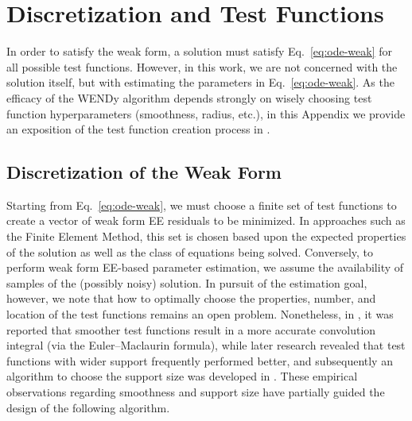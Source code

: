 \section{Discretization and Test Functions}\label{sec:appendix}
In order to satisfy the weak form, a solution must satisfy Eq.~\eqref{eq:ode-weak} for all possible test functions. However, in this work, we are not concerned with the solution itself, but with estimating the parameters in Eq.~\eqref{eq:ode-weak}. As the efficacy of the WENDy algorithm depends strongly on wisely choosing test function hyperparameters (smoothness, radius, etc.), in this Appendix we provide an exposition of the test function creation process in \cite{BortzMessengerDukic2023BullMathBiol}.
\subsection{Discretization of the Weak Form} \label{appendix:discWeak}

Starting from Eq.~\eqref{eq:ode-weak}, we must choose a finite set of test functions to create a vector of weak form EE residuals to be minimized. In approaches such as the Finite Element Method, this set is chosen based upon the expected properties of the solution as well as the class of equations being solved. Conversely, to perform weak form EE-based parameter estimation, we assume the availability of samples of the (possibly noisy) solution. In pursuit of the estimation goal, however, we note that how to optimally choose the properties, number, and location of the test functions remains an open problem.
Nonetheless, in \cite{MessengerBortz2021MultiscaleModelSimul}, it was reported that smoother test functions result in a more accurate convolution integral (via the Euler–Maclaurin formula), while later research revealed that test functions with wider support frequently performed better, and subsequently an algorithm to choose the support size was developed in  \cite{MessengerBortz2021JComputPhys}. These empirical observations regarding smoothness and support size have partially guided the design of the following algorithm.

